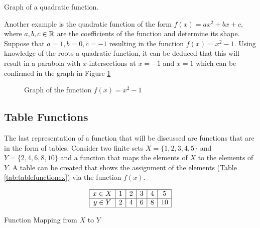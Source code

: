 \begin{example} Graph of a quadratic function.

    Another example is the quadratic function of the form $f(x) = ax^2 + bx + c$, where $a,b,c \in \mathbb{R}$ are the coefficients of the function and determine its shape. Suppose that $a = 1, b = 0, c = -1$ resulting in the function $f(x) = x^2 - 1$. Using knowledge of the roots a quadratic function, it can be deduced that this will result in a parabola with $x$-intersections at $x = -1$ and $x = 1$ which can be confirmed in the graph in Figure \ref{f(x)=x^2-1graph}

    \begin{figure}[!ht]
        \centering
        \label{f(x)=x^2-1graph}
        \caption{Graph of the function $f(x) = x^2-1$}
    \end{figure}
\end{example}

\subsection{Table Functions}\label{sect:table functions}

The last representation of a function that will be discussed are functions that are in the form of tables. Consider two finite sets $X = \{1,2,3,4,5\}$ and $Y = \{2,4,6,8,10\}$ and a function that maps the elements of $X$ to the elements of $Y$. A table can be created that shows the assignment of the elements (Table \ref{tab:tablefunctionex}) via the function $f(x)$.

\begin{table}[!ht]
    \centering
    \[
        \begin{array}{|*{6}{c|}}
            \hline
            x \in X & 1 & 2 & 3 & 4 & 5 \\
            \hline
            y \in Y & 2 & 4 & 6 & 8 & 10 \\
            \hline
        \end{array}
    \]
    \caption{Function Mapping from \( X \) to \( Y \)}
    \label{tab:tablefunctionex}
\end{table}

